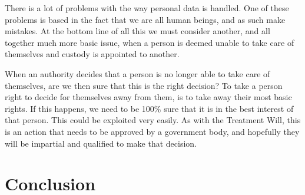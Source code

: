 \documentclass[11pt]{article}
\begin{document}
There is a lot of problems with the way personal data is handled. One of these problems is based in the fact that we are all human beings, and as such make mistakes.
At the bottom line of all this we must consider another, and all together much more basic issue, when a person is deemed unable to take care of themselves and custody is appointed to another.

When an authority decides that a person is no longer able to take care of themselves, are we then sure that this is the right decision? To take a person right to decide for themselves away from them, is to take away their most basic rights. If this happens, we need to be 100\% sure that it is in the best interest of that person. This could be exploited very easily. As with the Treatment Will, this is an action that needs to be approved by a government body, and hopefully they will be impartial and qualified to make that decision. 
\section{Conclusion}
\end{document}
